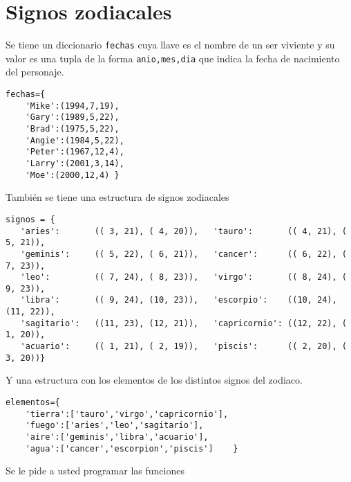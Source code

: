 \section{Signos zodiacales}
Se tiene un diccionario \texttt{fechas} cuya llave es el nombre de un ser viviente y su valor es una tupla de la forma \texttt{anio,mes,dia} que indica la fecha de nacimiento del personaje.

\begin{lstlisting}[style=consola]
fechas={
    'Mike':(1994,7,19),
    'Gary':(1989,5,22),
    'Brad':(1975,5,22),
    'Angie':(1984,5,22),
    'Peter':(1967,12,4),
    'Larry':(2001,3,14),
    'Moe':(2000,12,4) }
\end{lstlisting}

También se tiene una estructura de signos zodiacales

\begin{lstlisting}[style=consola]
signos = {
   'aries':       (( 3, 21), ( 4, 20)),   'tauro':       (( 4, 21), ( 5, 21)),
   'geminis':     (( 5, 22), ( 6, 21)),   'cancer':      (( 6, 22), ( 7, 23)),
   'leo':         (( 7, 24), ( 8, 23)),   'virgo':       (( 8, 24), ( 9, 23)),
   'libra':       (( 9, 24), (10, 23)),   'escorpio':    ((10, 24), (11, 22)),
   'sagitario':   ((11, 23), (12, 21)),   'capricornio': ((12, 22), ( 1, 20)),
   'acuario':     (( 1, 21), ( 2, 19)),   'piscis':      (( 2, 20), ( 3, 20))}
\end{lstlisting}
Y una estructura con los elementos de los distintos signos del zodiaco.
\begin{lstlisting}[style=consola]
elementos={
    'tierra':['tauro','virgo','capricornio'],
    'fuego':['aries','leo','sagitario'],
    'aire':['geminis','libra','acuario'],
    'agua':['cancer','escorpion','piscis']    }
\end{lstlisting}
Se le pide a usted programar las funciones
